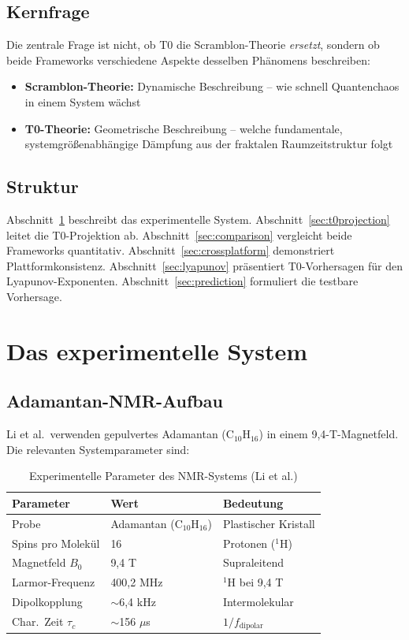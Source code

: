 \subsection{Kernfrage}

Die zentrale Frage ist nicht, ob T0 die Scramblon-Theorie \emph{ersetzt}, sondern ob beide Frameworks verschiedene Aspekte desselben Phänomens beschreiben:
\begin{itemize}
	\item \textbf{Scramblon-Theorie:} Dynamische Beschreibung -- wie schnell Quantenchaos in einem System wächst
	\item \textbf{T0-Theorie:} Geometrische Beschreibung -- welche fundamentale, systemgrößenabhängige Dämpfung aus der fraktalen Raumzeitstruktur folgt
\end{itemize}

\subsection{Struktur}

Abschnitt~\ref{sec:system} beschreibt das experimentelle System. Abschnitt~\ref{sec:t0projection} leitet die T0-Projektion ab. Abschnitt~\ref{sec:comparison} vergleicht beide Frameworks quantitativ. Abschnitt~\ref{sec:crossplatform} demonstriert Plattformkonsistenz. Abschnitt~\ref{sec:lyapunov} präsentiert T0-Vorhersagen für den Lyapunov-Exponenten. Abschnitt~\ref{sec:prediction} formuliert die testbare Vorhersage.


\section{Das experimentelle System}
\label{sec:system}

\subsection{Adamantan-NMR-Aufbau}

Li et al.\ verwenden gepulvertes Adamantan (C$_{10}$H$_{16}$) in einem 9,4-T-Magnetfeld. Die relevanten Systemparameter sind:

\begin{table}[h]
	\centering
	\caption{Experimentelle Parameter des NMR-Systems (Li et al.)}
	\label{tab:system_params}
	\begin{tabular}{@{}lll@{}}
		\toprule
		Parameter & Wert & Bedeutung \\
		\midrule
		Probe & Adamantan (C$_{10}$H$_{16}$) & Plastischer Kristall \\
		Spins pro Molekül & 16 & Protonen ($^1$H) \\
		Magnetfeld $B_0$ & 9,4 T & Supraleitend \\
		Larmor-Frequenz & 400,2 MHz & $^1$H bei 9,4 T \\
		Dipolkopplung & $\sim$6,4 kHz & Intermolekular \\
		Char.\ Zeit $\tau_c$ & $\sim$156 $\mu$s & $1/f_{\text{dipolar}}$ \\
		\bottomrule
	\end{tabular}
\end{table}

